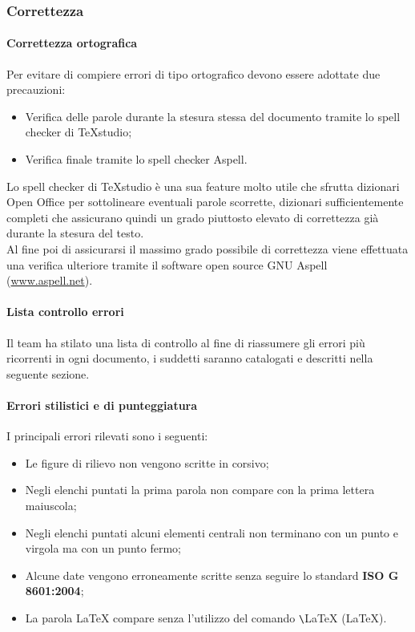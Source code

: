 \subsubsection{Correttezza}
\paragraph{Correttezza ortografica}
Per evitare di compiere errori di tipo ortografico devono essere adottate due precauzioni:
\begin{itemize}
\item Verifica delle parole durante la stesura stessa del documento tramite lo spell checker di TeXstudio;
\item Verifica finale tramite lo spell checker Aspell.
\end{itemize}
Lo spell checker di TeXstudio è una sua feature molto utile che sfrutta dizionari Open Office per sottolineare eventuali parole scorrette, dizionari sufficientemente completi che assicurano quindi un grado piuttosto elevato di correttezza già durante la stesura del testo. \\
Al fine poi di assicurarsi il massimo grado possibile di correttezza viene effettuata una verifica ulteriore tramite il software open source GNU Aspell
(\href{http://www.aspell.net/}{www.aspell.net}).
 
\paragraph{Lista controllo errori}
Il team ha stilato una lista di controllo al fine di riassumere gli errori più ricorrenti in ogni documento, i suddetti saranno catalogati e descritti nella seguente sezione.
\paragraph{Errori stilistici e di punteggiatura}
I principali errori rilevati sono i seguenti:
\begin{itemize}
\item Le figure di rilievo non vengono scritte in corsivo;
\item Negli elenchi puntati la prima parola non compare con la prima lettera maiuscola;
\item Negli elenchi puntati alcuni elementi centrali non terminano con un punto e virgola ma con un punto fermo;
\item Alcune date vengono erroneamente scritte senza seguire lo standard \textbf{ISO G 8601:2004};
\item La parola LaTeX compare senza l'utilizzo del comando \verb+\+LaTeX (\LaTeX).
\end{itemize}
